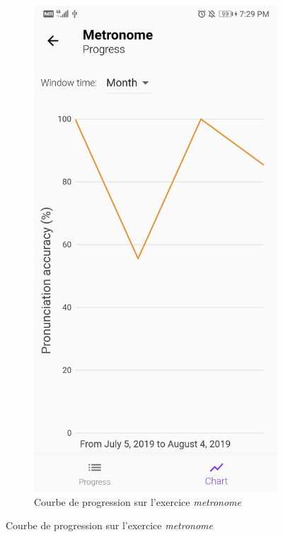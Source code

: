 \begin{appendices}
\begin{landscape}
\begin{figure}[h]
\begin{subfigure}{.25\textwidth}
    \includegraphics[width=.75\linewidth]{content/imgs/screen8.jpg}
    \caption{Courbe de progression sur l'exercice \textit{metronome}}
  \end{subfigure}
\end{figure}



\end{landscape}
\end{appendices}
